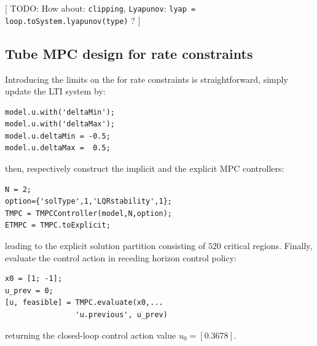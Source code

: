 \documentclass[letterpaper, 10 pt, conference]{ieeeconf}
\begin{document}
[ TODO: How about: \texttt{clipping}, \texttt{Lyapunov}: \texttt{lyap = loop.toSystem.lyapunov(type)} ? ]

\subsection{Tube MPC design for rate constraints}
\label{sec:mptplus_tube_mpc_delta_u}

Introducing the limits on the for rate constraints is straightforward, simply update the LTI system by:
\begin{lstlisting}[style=Matlab-editor]
model.u.with('deltaMin');
model.u.with('deltaMax');
model.u.deltaMin = -0.5;
model.u.deltaMax =  0.5;
\end{lstlisting}
then, respectively construct the implicit and the explicit MPC controllers:
\begin{lstlisting}[style=Matlab-editor]
N = 2;
option={'solType',1,'LQRstability',1};
TMPC = TMPCController(model,N,option);
ETMPC = TMPC.toExplicit;
\end{lstlisting}
leading to the explicit solution partition consisting of $520$ critical regions. Finally, evaluate the control action in receding horizon control policy:
\begin{lstlisting}[style=Matlab-editor]
x0 = [1; -1];
u_prev = 0;
[u, feasible] = TMPC.evaluate(x0,...
                'u.previous', u_prev)
\end{lstlisting}
returning the closed-loop control action value $u_0 = [0.3678]$.

%
\end{document}
